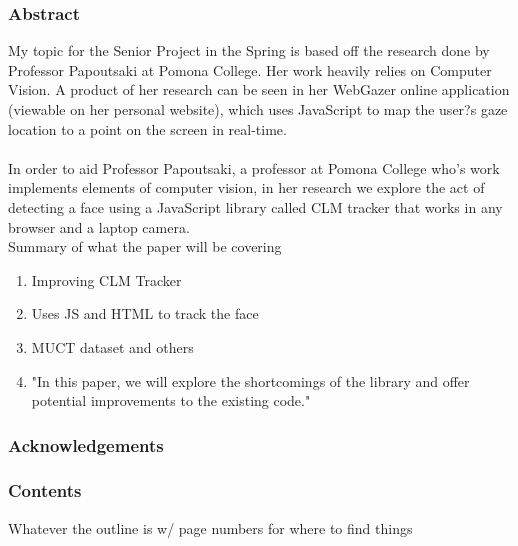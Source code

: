 \documentclass{article}
\begin{document}
\subsubsection*{\hspace{20mm}Abstract}
\begin{adjustwidth}{2cm}{2cm}

My topic for the Senior Project in the Spring is based off the research done by Professor Papoutsaki at Pomona College. Her work heavily relies on Computer Vision. A product of her research can be seen in her WebGazer online application (viewable on her personal website), which uses JavaScript to map the user?s gaze location to a point on the screen in real-time.\\\\



In order to aid Professor Papoutsaki, a professor at Pomona College who's work implements elements of computer vision, in her research we explore the act of detecting a face using a JavaScript library called CLM tracker that works in any browser and a laptop camera. 
\\

Summary of what the paper will be covering
\begin{enumerate}
	\item Improving CLM Tracker
	\item Uses JS and HTML to track the face
	\item MUCT dataset and others
	\item "In this paper, we will explore the shortcomings of the library and offer potential improvements to the existing code."
\end{enumerate}

\end{adjustwidth}

\newpage

\subsubsection*{Acknowledgements}

\newpage

\subsubsection*{Contents}

\large{Whatever the outline is w/ page numbers for where to find things}
	
\newpage
\end{document}
